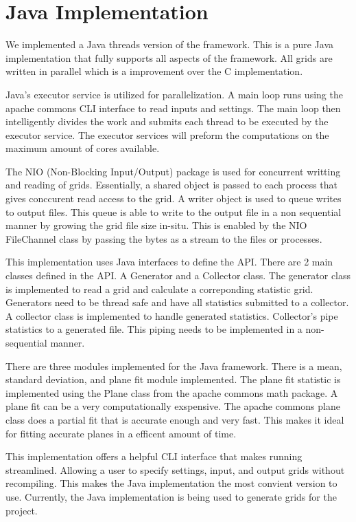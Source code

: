 \section{Java Implementation}

We implemented a Java threads version of the framework.
This is a pure Java implementation that fully supports all aspects of the framework.
All grids are written in parallel which is a improvement over the C implementation.

\par
Java's executor service is utilized for parallelization.
A main loop runs using the apache commons CLI interface to read inputs and settings.
The main loop then intelligently divides the work and submits each thread to be executed by the executor service.
The executor services will preform the computations on the maximum amount of cores available.

\par
The NIO (Non-Blocking Input/Output) package is used for concurrent writting and reading of grids.
Essentially, a shared object is passed to each process that gives conccurent read access to the grid.
A writer object is used to queue writes to output files.
This queue is able to write to the output file in a non sequential manner by growing the grid file size in-situ.
This is enabled by the NIO FileChannel class by passing the bytes as a stream to the files or processes.

\par
This implementation uses Java interfaces to define the API.
There are 2 main classes defined in the API.
A Generator and a Collector class.
The generator class is implemented to read a grid and calculate a correponding statistic grid.
Generators need to be thread safe and have all statistics submitted to a collector.
A collector class is implemented to handle generated statistics.
Collector's pipe statistics to a generated file.
This piping needs to be implemented in a non-sequential manner.

\par
There are three modules implemented for the Java framework.
There is a mean, standard deviation, and plane fit module implemented.
The plane fit statistic is implemented using the Plane class from the apache commons math package.
A plane fit can be a very computationally exspensive.
The apache commons plane class does a partial fit that is accurate enough and very fast.
This makes it ideal for fitting accurate planes in a efficent amount of time.

\par
This implementation offers a helpful CLI interface that makes running streamlined.
Allowing a user to specify settings, input, and output grids without recompiling.
This makes the Java implementation the most convient version to use.
Currently, the Java implementation is being used to generate grids for the project.
